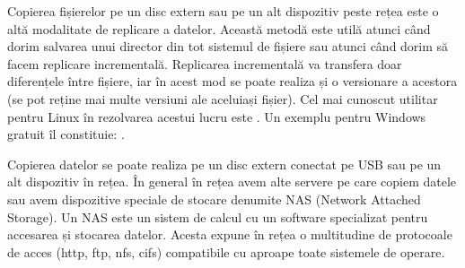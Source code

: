 Copierea fișierelor pe un disc extern sau pe un alt dispozitiv peste rețea este
o altă modalitate de replicare a datelor. Această metodă este utilă atunci când
dorim salvarea unui director din tot sistemul de fișiere sau atunci când dorim
să facem replicare incrementală. Replicarea incrementală va transfera doar
diferențele între fișiere, iar în acest mod se poate realiza și o versionare a
acestora (se pot reține mai multe versiuni ale aceluiași fișier). Cel mai
cunoscut utilitar pentru Linux în rezolvarea acestui lucru este . Un
exemplu pentru Windows gratuit îl constituie: .

Copierea datelor se poate realiza pe un disc extern conectat pe USB sau pe un
alt dispozitiv în rețea. În general în rețea avem alte servere pe care copiem
datele sau avem dispozitive speciale de stocare denumite NAS (Network Attached
Storage). Un NAS este un sistem de calcul cu un software specializat pentru
accesarea și stocarea datelor. Acesta expune în rețea o multitudine de
protocoale de acces (http, ftp, nfs, cifs) compatibile cu aproape toate
sistemele de operare.
